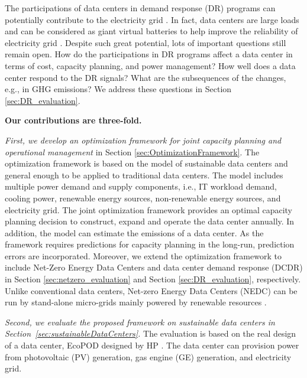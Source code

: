 
The participations of data centers in demand response (DR) programs can potentially contribute to the electricity grid \cite{wierman2014opportunities,liu2014pricing}. In fact, data centers are large loads and can be considered as giant virtual batteries to help improve the reliability of electricity grid \cite{wierman2014opportunities}. Despite such great potential, lots of important questions still remain open. How do the participations in DR programs affect a data center in terms of cost, capacity planning, and power management? How well does a data center respond to the DR signals? What are the subsequences of the changes, e.g., in GHG emissions? We address these questions in Section \ref{sec:DR_evaluation}.

\textbf{Our contributions are three-fold.}

\emph{First, we develop an optimization framework for joint capacity planning and operational management} in Section \ref{sec:OptimizationFramework}. The optimization framework is based on the model of sustainable data centers and general enough to be applied to traditional data centers. The model includes multiple power demand and supply components, i.e., IT workload demand, cooling power, renewable energy sources, non-renewable energy sources, and electricity grid. The joint optimization framework provides an optimal capacity planning decision to construct, expand and operate the data center annually. In addition, the model can estimate the emissions of a data center.
As the framework requires predictions for capacity planning in the long-run, prediction errors are incorporated. Moreover, we extend the optimization framework to include Net-Zero Energy Data Centers and data center demand response (DCDR) in Section \ref{sec:netzero_evaluation} and Section \ref{sec:DR_evaluation}, respectively. Unlike conventional data centers, Net-zero Energy Data Centers (NEDC) can be run by stand-alone micro-grids mainly powered by renewable resources \cite{arlitt2012towards}.

\emph{Second, we evaluate the proposed framework on sustainable data centers in Section~\ref{sec:sustainableDataCenters}.} The evaluation is based on the real design of a data center, EcoPOD designed by HP \cite{hpEcoPODs}. The data center can provision power from photovoltaic (PV) generation, gas engine (GE) generation, and electricity grid.

